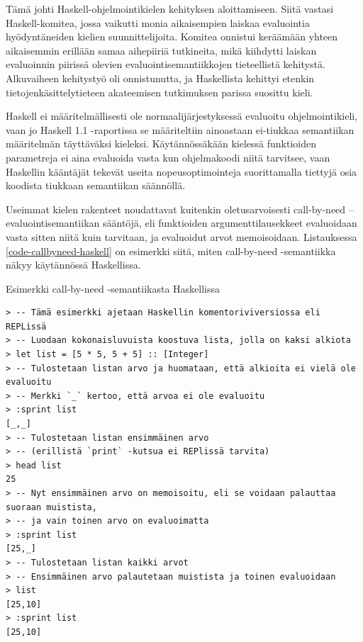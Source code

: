Tämä johti Haskell-ohjelmointikielen kehityksen aloittamiseen. Siitä vastasi Haskell-komitea, jossa vaikutti monia aikaisempien laiskaa evaluointia hyödyntäneiden kielien suunnittelijoita. Komitea onnistui keräämään yhteen aikaisemmin erillään samaa aihepiiriä tutkineita, mikä kiihdytti laiskan evaluoinnin piirissä olevien evaluointisemantiikkojen tieteellistä kehitystä. Alkuvaiheen kehitystyö oli onnistunutta, ja Haskellista kehittyi etenkin tietojenkäsittelytieteen akateemisen tutkimuksen parissa suosittu kieli.

Haskell ei määritelmällisesti ole normaalijärjestyksessä evaluoitu ohjelmointikieli, vaan jo Haskell 1.1 -raportissa \citep{yale1991report} se määriteltiin ainoastaan ei-tiukkaa semantiikan määritelmän täyttäväksi kieleksi. Käytännössäkään kielessä funktioiden parametreja ei aina evaluoida vasta kun ohjelmakoodi niitä tarvitsee, vaan Haskellin kääntäjät tekevät useita nopeusoptimointeja suorittamalla tiettyjä osia koodista tiukkaan semantiikan säännöllä.

Useimmat kielen rakenteet noudattavat kuitenkin oletusarvoisesti call-by-need –evaluointisemantiikan sääntöjä, eli funktioiden argumenttilausekkeet evaluoidaan vasta sitten niitä kuin tarvitaan, ja evaluoidut arvot memoisoidaan. Listauksessa \ref{code-callbyneed-haskell} on esimerkki siitä, miten call-by-need -semantiikka näkyy käytännössä Haskellissa.

\begin{listing}[H]
  \caption{Esimerkki call-by-need -semantiikasta Haskellissa}
  \label{code-callbyneed-haskell}
  \bigskip
  \begin{verbatim}
> -- Tämä esimerkki ajetaan Haskellin komentoriviversiossa eli REPLissä
> -- Luodaan kokonaisluvuista koostuva lista, jolla on kaksi alkiota
> let list = [5 * 5, 5 + 5] :: [Integer]
> -- Tulostetaan listan arvo ja huomataan, että alkioita ei vielä ole evaluoitu
> -- Merkki `_` kertoo, että arvoa ei ole evaluoitu
> :sprint list
[_,_]
> -- Tulostetaan listan ensimmäinen arvo
> -- (erillistä `print` -kutsua ei REPlissä tarvita)
> head list
25
> -- Nyt ensimmäinen arvo on memoisoitu, eli se voidaan palauttaa suoraan muistista,
> -- ja vain toinen arvo on evaluoimatta
> :sprint list
[25,_]
> -- Tulostetaan listan kaikki arvot
> -- Ensimmäinen arvo palautetaan muistista ja toinen evaluoidaan
> list
[25,10]
> :sprint list
[25,10]
\end{verbatim}
\end{listing}


